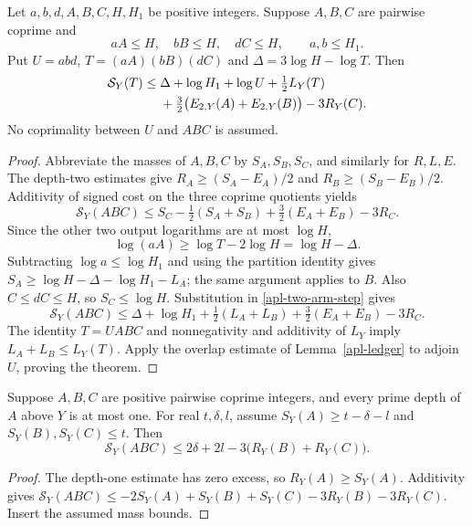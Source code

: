 \begin{theorem}
\label{apl-finite-compensation}
Let $a,b,d,A,B,C,H,H_1$ be positive integers. Suppose $A,B,C$
are pairwise coprime and
\[
 aA\le H,\quad bB\le H,\quad dC\le H,
 \qquad a,b\le H_1.
\]
Put $U=abd$, $T=(aA)(bB)(dC)$ and
$\Delta=3\log H-\log T$. Then
\begin{align}
 \mathcal S_Y(T)\le{}&\Delta+\log H_1+\log U+\tfrac12 L_Y(T)
 \label{apl-finite-bound}\\
 &+\tfrac32\bigl(E_{2,Y}(A)+E_{2,Y}(B)\bigr)-3R_Y(C).\notag
\end{align}
No coprimality between $U$ and $ABC$ is assumed.
\end{theorem}
\begin{proof}
Abbreviate the masses of $A,B,C$ by $S_A,S_B,S_C$, and similarly
for $R,L,E$. The depth-two estimates give
$R_A\ge(S_A-E_A)/2$ and $R_B\ge(S_B-E_B)/2$.
Additivity of signed cost on the three coprime quotients yields
\begin{equation}\label{apl-two-arm-step}
 \mathcal S_Y(ABC)\le S_C-\tfrac12(S_A+S_B)
                         +\tfrac32(E_A+E_B)-3R_C.
\end{equation}
Since the other two output logarithms are at most $\log H$,
\[
 \log(aA)\ge\log T-2\log H=\log H-\Delta.
\]
Subtracting $\log a\le\log H_1$ and using the partition identity gives
$S_A\ge\log H-\Delta-\log H_1-L_A$; the same argument applies
to $B$. Also $C\le dC\le H$, so $S_C\le\log H$.
Substitution in \eqref{apl-two-arm-step} gives
\[
 \mathcal S_Y(ABC)\le\Delta+\log H_1+\tfrac12(L_A+L_B)
                              +\tfrac32(E_A+E_B)-3R_C.
\]
The identity $T=UABC$ and nonnegativity and additivity of $L_Y$
imply $L_A+L_B\le L_Y(T)$. Apply the overlap estimate of
Lemma~\ref{apl-ledger} to adjoin $U$, proving the theorem.
\end{proof}

\begin{proposition}\label{apl-squarefree}
Suppose $A,B,C$ are positive pairwise coprime integers, and every
prime depth of $A$ above $Y$ is at most one. For real $t,\delta,l$,
assume $S_Y(A)\ge t-\delta-l$ and $S_Y(B),S_Y(C)\le t$.
Then
\[
 \mathcal S_Y(ABC)\le2\delta+2l-3\bigl(R_Y(B)+R_Y(C)\bigr).
\]
\end{proposition}
\begin{proof}
The depth-one estimate has zero excess, so $R_Y(A)\ge S_Y(A)$.
Additivity gives
$\mathcal S_Y(ABC)\le-2S_Y(A)+S_Y(B)+S_Y(C)-3R_Y(B)-3R_Y(C)$.
Insert the assumed mass bounds.
\end{proof}

